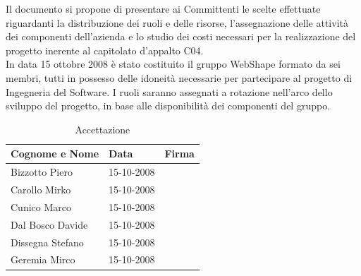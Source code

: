 \newpage
\thispagestyle{fancy}
\tableofcontents
\thispagestyle{fancy}
\newpage


Il documento si propone di presentare ai Committenti le scelte effettuate riguardanti la distribuzione dei ruoli e delle risorse, l'assegnazione delle attivit\`a dei componenti dell'azienda e lo studio dei costi necessari per la realizzazione del progetto inerente al capitolato d'appalto C04.\\

In data 15 ottobre 2008 \`e stato costituito il gruppo WebShape formato da sei membri, tutti in possesso delle idoneit\`a necessarie per partecipare al progetto di Ingegneria del Software.
I ruoli saranno assegnati a rotazione nell'arco dello sviluppo del progetto, in base alle disponibilit\`a dei componenti del gruppo.\\

\begin{table}[h]
	\begin{center}
		  \begin{tabular}{|p{}|l|p{}|}
		 \hline 
		 \textbf{Cognome e Nome} & \textbf{Data} & \textbf{Firma}\\
		 \hline
		Bizzotto Piero & 15-10-2008 & \\
		\hline
		Carollo Mirko & 15-10-2008 & \\
		\hline
		Cunico Marco & 15-10-2008 & \\
		\hline
		Dal Bosco Davide & 15-10-2008 & \\
		\hline
		Dissegna Stefano & 15-10-2008 & \\
		\hline
		Geremia Mirco & 15-10-2008 & \\
		\hline
		\end{tabular}
	\caption{Accettazione} 
	\label{tabella_accettazione}
	\end{center}	
\end{table}

\newpage


